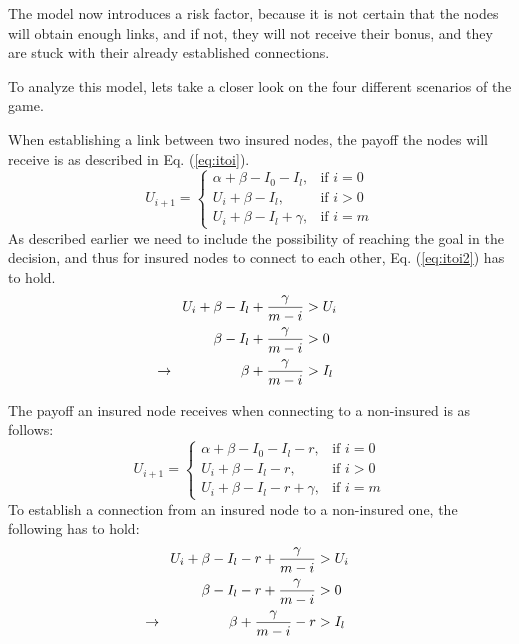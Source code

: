  The model now introduces a risk factor, because it is not certain that the nodes will obtain enough links, and if not, they will not receive their bonus, and they are stuck with their already established connections. 

To analyze this model, lets take a closer look on the four different scenarios of the game.

When establishing a link between two insured nodes, the payoff the nodes will receive is as described in Eq. (\ref{eq:itoi}).
\begin{equation}
    U_{i+1}= 
\begin{cases}
    \alpha + \beta - I_{0} - I_{l},& \text{if } i = 0\\
    U_{i}+\beta -I_{l},& \text{if }  i>0\\
    U_{i}+\beta -I_{l}+\gamma,& \text{if } i=m
    
\end{cases}
\label{eq:itoi}
\end{equation}
As described earlier we need to include the possibility of reaching the goal in the decision, and thus for insured nodes to connect to each other, Eq. (\ref{eq:itoi2}) has to hold.
\begin{eqnarray}
U_{i}+\beta-I_{l}+\frac{\gamma}{m-i}&>U_{i} \nonumber \\ 
\beta-I_{l}+\frac{\gamma}{m-i}&>0 \nonumber \\ 
\llap{$\rightarrow$\hspace{50pt}} \beta+\frac{\gamma}{m-i}&>I_{l} 
\label{eq:itoi2}
\end{eqnarray}

The payoff an insured node receives when connecting to a non-insured is as follows:
\begin{equation}
    U_{i+1}= 
\begin{cases}
    \alpha + \beta - I_{0} - I_{l} -r,& \text{if } i = 0\\
    U_{i}+\beta -I_{l}-r,& \text{if }  i>0\\
    U_{i}+\beta -I_{l}-r+\gamma,& \text{if } i=m
\end{cases}
\label{eq:itonoti}
\end{equation}
To establish a connection from an insured node to a non-insured one, the following has to hold:
\begin{eqnarray}
U_{i}+\beta-I_{l}-r+\frac{\gamma}{m-i}&>U_{i} \nonumber \\ 
\beta-I_{l}-r+\frac{\gamma}{m-i}&>0 \nonumber \\ 
\llap{$\rightarrow$\hspace{50pt}} \beta+\frac{\gamma}{m-i}-r&>I_{l} 
\end{eqnarray}

